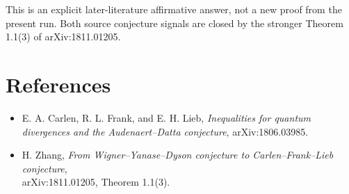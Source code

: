 \documentclass[11pt]{article}
\begin{document}
This is an explicit later-literature affirmative answer, not a new proof from
the present run.  Both source conjecture signals are closed by the stronger
Theorem 1.1(3) of arXiv:1811.01205.

\section*{References}

\begin{itemize}
\item E. A. Carlen, R. L. Frank, and E. H. Lieb,
\emph{Inequalities for quantum divergences and the Audenaert--Datta
conjecture}, arXiv:1806.03985.
\item H. Zhang,
\emph{From Wigner--Yanase--Dyson conjecture to Carlen--Frank--Lieb
conjecture},\\
arXiv:1811.01205, Theorem 1.1(3).
\end{itemize}
\end{document}
